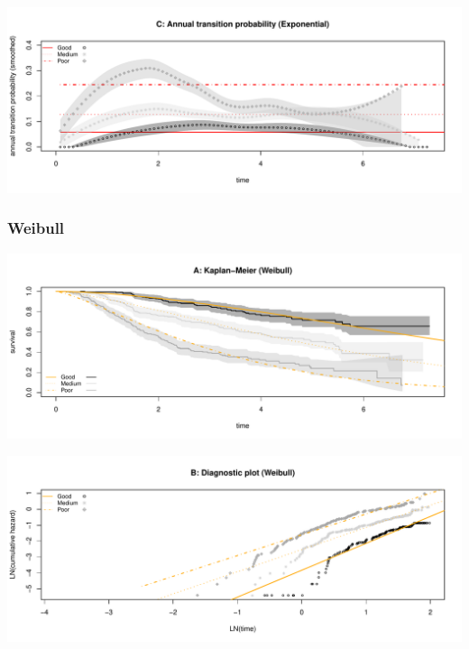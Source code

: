 \documentclass[
]{article}
\begin{document}
\begin{flushleft}\includegraphics[height=0.25\textheight]{BC_OS_output/Images/Figure_param_models-3} \end{flushleft}

\clearpage

\subsubsection{Weibull}\label{weibull}

\begin{flushleft}\includegraphics[height=0.25\textheight]{BC_OS_output/Images/Figure_param_models-4} \end{flushleft}

\begin{flushleft}\includegraphics[height=0.25\textheight]{BC_OS_output/Images/Figure_param_models-5} \end{flushleft}
\end{document}
